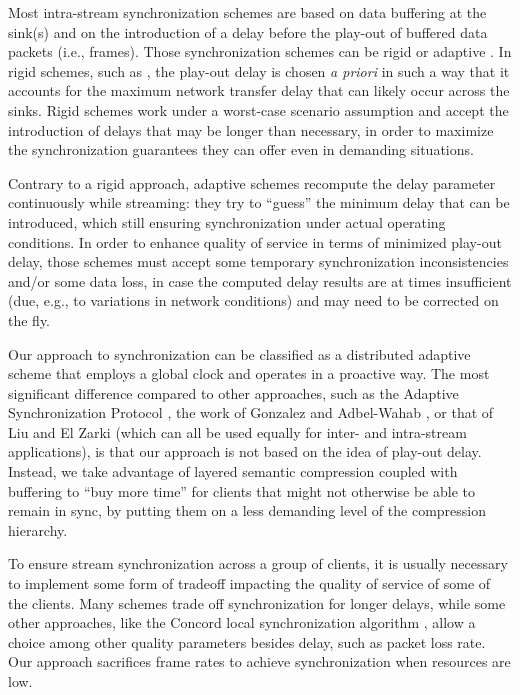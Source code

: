 \documentclass{sig-alternate}
\begin{document}
Most intra-stream synchronization schemes are based on data buffering
at the sink(s) and on the introduction of a delay before the play-out
of buffered data packets (i.e., frames).  Those synchronization
schemes can be rigid or adaptive \cite{clark92supporting}.  In rigid schemes,
such as \cite{Ferrari}, the play-out delay is chosen {\it a priori} in
such a way that it accounts for the maximum network transfer delay
that can likely occur across the sinks.  Rigid schemes work under a
worst-case scenario assumption and accept the introduction of delays
that may be longer than necessary, in order to maximize the
synchronization guarantees they can offer even in demanding
situations.

Contrary to a rigid approach, adaptive schemes
\cite{ASP,Lancaster,FSP} recompute the delay parameter continuously
while streaming: they try to ``guess'' the minimum delay that can be
introduced, which still ensuring synchronization under actual
operating conditions.  In order to enhance quality of service in terms
of minimized play-out delay, those schemes must accept some temporary
synchronization inconsistencies and/or some data loss, in case the
computed delay results are at times insufficient (due, e.g., to
variations in network conditions) and may need to be corrected on the
fly.

Our approach to synchronization can be classified as a distributed
adaptive scheme that employs a global clock and operates in a
proactive way.  The most significant difference compared to other
approaches, such as the Adaptive Synchronization Protocol \cite{ASP},
the work of Gonzalez and Adbel-Wahab \cite{GONZALEZ}, or that of Liu
and El Zarki\cite{LIUSYNC} (which can all be used equally for inter- and
intra-stream applications), is that our approach is not based on the
idea of play-out delay.  Instead, we take advantage of layered
semantic compression coupled with buffering to ``buy more time'' for
clients that might not otherwise be able to remain in sync, by putting
them on a less demanding level of the compression hierarchy.

To ensure stream synchronization across a group of clients, it is
usually necessary to implement some form of tradeoff impacting the
quality of service of some of the clients.  Many schemes trade off
synchronization for longer delays, while some other approaches, like
the Concord local synchronization algorithm
\cite{shivakumar95concord}, allow a choice among other quality
parameters besides delay, such as packet loss rate.  Our approach
sacrifices frame rates to achieve synchronization when resources are
low.
\end{document}
